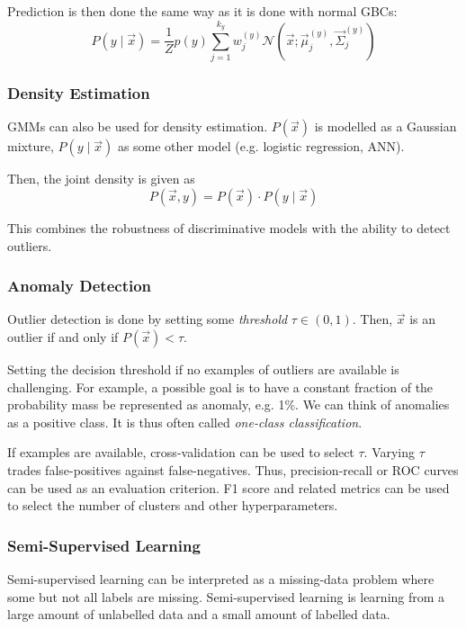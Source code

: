 Prediction is then done the same way
as it is done with normal GBCs:
\begin{equation*}
P(y \mid \vec{x}) = \frac{1}{Z}
p(y) \sum_{j = 1}^{k_y}{
	w_j^{(y)}
	\mathcal{N}(\vec{x}; \vec{\mu}_j^{(y)}, \vec{\Sigma}_j^{(y)})
}
\end{equation*}

\subsubsection{Density Estimation}
GMMs can also be used for density estimation.
$P(\vec{x})$ is modelled as a Gaussian mixture,
$P(y \mid \vec{x})$ as some other model
(e.g. logistic regression, ANN).

Then, the joint density is given as
\begin{equation*}
P(\vec{x}, y) = P(\vec{x}) \cdot P(y \mid \vec{x})
\end{equation*}

This combines the robustness of
discriminative models with the
ability to detect outliers.

\subsubsection{Anomaly Detection}
Outlier detection is done by setting some
\emph{threshold} $\tau \in (0, 1)$.
Then, $\vec{x}$ is an outlier if
and only if
$P(\vec{x}) < \tau$.

Setting the decision threshold if no
examples of outliers are available
is challenging.
For example,
a possible goal is to have a constant
fraction of the probability mass
be represented as anomaly, e.g. 1\%.
We can think of anomalies as a positive class.
It is thus often called \emph{one-class classification}.

If examples are available,
cross-validation can be used
to select $\tau$.
Varying $\tau$ trades false-positives
against false-negatives.
Thus, precision-recall or ROC curves
can be used as an evaluation criterion.
F1 score and related metrics can
be used to select the number of clusters
and other hyperparameters.

\subsubsection{Semi-Supervised Learning}
Semi-supervised learning can be interpreted
as a missing-data problem where
some but not all labels are missing.
Semi-supervised learning is learning
from a large amount of unlabelled data and
a small amount of labelled data.

